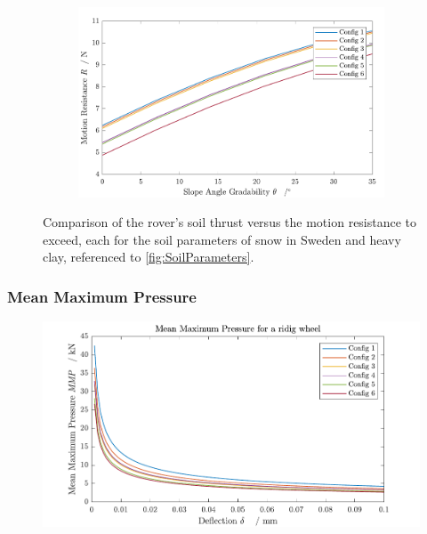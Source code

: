 \begin{figure}[htb]
\begin{subfigure}[b]{0.49\textwidth}
         \label{fig:trappedelectronsJupiter}
     \end{subfigure}
     \hfill
     \begin{subfigure}[b]{0.49\textwidth}
         \centering
         \includegraphics[width=\textwidth]{Media/ResistanceSnow.pdf}
         \label{fig:trappedprotonsJupiter}
     \end{subfigure}
     \caption{Comparison of the rover's soil thrust versus the motion resistance to exceed, each for the soil parameters of snow in Sweden and heavy clay, referenced to \autoref{fig:SoilParameters}.}
     \label{fig:SoilThrust_MotionResistance}
\end{figure}




\subsubsection*{Mean Maximum Pressure}
\label{sec:MMP}

\begin{figure}[htb] 
  \centering
     \includegraphics[width=1\textwidth]{Media/MMP for each Config.pdf}
  \caption{}
  \label{fig:MMP}
\end{figure}




